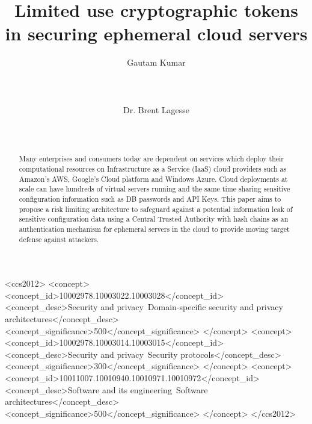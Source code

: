 \documentclass{sig-alternate-05-2015}
\begin{document}
\title{Limited use cryptographic tokens in securing ephemeral cloud servers}

\author{
%
%
\alignauthor
Gautam Kumar\\
       \\
       \\
       \\
\alignauthor
Dr. Brent Lagesse\\
       \\
       \\
}



\maketitle


\begin{abstract}

Many enterprises and consumers today are dependent on services which deploy their computational resources on Infrastructure as a Service (IaaS) cloud providers such as Amazon's AWS, Google's Cloud platform and Windows Azure. Cloud deployments at scale can have hundreds of virtual servers running and the same time sharing sensitive configuration information such as DB passwords and API Keys. This paper aims to propose a risk limiting architecture to safeguard against a potential information leak of sensitive configuration data using a Central Trusted Authority with hash chains as an authentication mechanism for ephemeral servers in the cloud to provide moving target defense against attackers.
\end{abstract}


\begin{CCSXML}
<ccs2012>
<concept>
<concept_id>10002978.10003022.10003028</concept_id>
<concept_desc>Security and privacy~Domain-specific security and privacy architectures</concept_desc>
<concept_significance>500</concept_significance>
</concept>
<concept>
<concept_id>10002978.10003014.10003015</concept_id>
<concept_desc>Security and privacy~Security protocols</concept_desc>
<concept_significance>300</concept_significance>
</concept>
<concept>
<concept_id>10011007.10010940.10010971.10010972</concept_id>
<concept_desc>Software and its engineering~Software architectures</concept_desc>
<concept_significance>500</concept_significance>
</concept>
</ccs2012>
\end{CCSXML}
\end{document}
